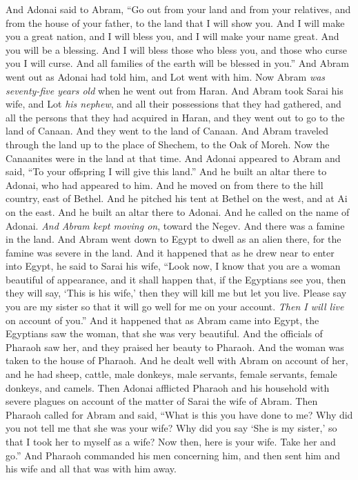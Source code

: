 \begin{biblechapter} %
 And Adonai said to Abram, “Go out from your land and from your relatives, and from the house of your father, to the land that I will show you.
\verse And I will make you a great nation, and I will bless you, and I will make your name great. And you will be a blessing.
\verse And I will bless those who bless you, and those who curse you I will curse. And all families of the earth will be blessed in you.”
 And Abram went out as Adonai had told him, and Lot went with him. Now Abram \textit{was seventy-five years old} when he went out from Haran.
\verse And Abram took Sarai his wife, and Lot \textit{his nephew}, and all their possessions that they had gathered, and all the persons that they had acquired in Haran, and they went out to go to the land of Canaan. And they went to the land of Canaan.
\verse And Abram traveled through the land up to the place of Shechem, to the Oak of Moreh. Now the Canaanites were in the land at that time.
\verse And Adonai appeared to Abram and said, “To your offspring I will give this land.” And he built an altar there to Adonai, who had appeared to him.
\verse And he moved on from there to the hill country, east of Bethel. And he pitched his tent at Bethel on the west, and at Ai on the east. And he built an altar there to Adonai. And he called on the name of Adonai.
\verse \textit{And Abram kept moving on}, toward the Negev.
\verse And there was a famine in the land. And Abram went down to Egypt to dwell as an alien there, for the famine was severe in the land.
\verse And it happened that as he drew near to enter into Egypt, he said to Sarai his wife, “Look now, I know that you are a woman beautiful of appearance,
\verse and it shall happen that, if the Egyptians see you, then they will say, ‘This is his wife,’ then they will kill me but let you live.
\verse Please say you are my sister so that it will go well for me on your account. \textit{Then I will live} on account of you.”
\verse And it happened that as Abram came into Egypt, the Egyptians saw the woman, that she was very beautiful.
\verse And the officials of Pharaoh saw her, and they praised her beauty to Pharaoh. And the woman was taken to the house of Pharaoh.
\verse And he dealt well with Abram on account of her, and he had sheep, cattle, male donkeys, male servants, female servants, female donkeys, and camels.
\verse Then Adonai afflicted Pharaoh and his household with severe plagues on account of the matter of Sarai the wife of Abram.
\verse Then Pharaoh called for Abram and said, “What is this you have done to me? Why did you not tell me that she was your wife?
\verse Why did you say ‘She is my sister,’ so that I took her to myself as a wife? Now then, here is your wife. Take her and go.”
\verse And Pharaoh commanded his men concerning him, and then sent him and his wife and all that was with him away.
\end{biblechapter}

